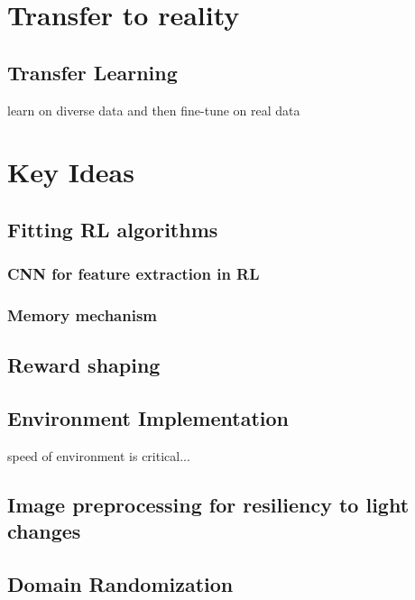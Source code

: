 \section{Transfer to reality}

\subsection{Transfer Learning}
learn on diverse data and then fine-tune on real data







\section{Key Ideas}

\subsection{Fitting RL algorithms}

\subsubsection{CNN for feature extraction in RL}

\subsubsection{Memory mechanism}


\subsection{Reward shaping}

\subsection{Environment Implementation}

speed of environment is critical...


\subsection{Image preprocessing for resiliency to light changes}

\subsection{Domain Randomization}







